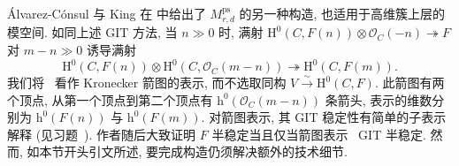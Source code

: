 \begin{remark}[箭图构造]\label{src:9.5.20}
\'Alvarez-C\'onsul 与 King 在 \cite{CK07} 中给出了 $M_{r,d}^{\mathrm{ps}}$ 的另一种构造, 也适用于高维簇上层的模空间. 如同上述 GIT 方法, 当 $n\gg0$ 时, 满射 $\mathrm H^0(C,F(n))\otimes\mathcal O_C(-n)\twoheadrightarrow F$ 对 $m-n\gg0$ 诱导满射
\begin{equation}\label{src:9.5.21}
\mathrm H^0(C,F(n))\otimes\mathrm H^0(C,\mathcal O_C(m-n))\twoheadrightarrow\mathrm H^0(C,F(m)).
\end{equation}
我们将~ 看作 Kronecker 箭图的表示, 而不选取同构 $V\xrightarrow{\sim}\mathrm H^0(C,F)$. 此箭图有两个顶点, 从第一个顶点到第二个顶点有 $\mathrm h^0(\mathcal O_C(m-n))$ 条箭头, 表示的维数分别为 $\mathrm h^0(F(n))$ 与 $\mathrm h^0(F(m))$. 对箭图表示, 其 GIT 稳定性有简单的子表示解释 (见习题~). 作者随后大致证明 $F$ 半稳定当且仅当箭图表示~ GIT 半稳定. 然而, 如本节开头引文所述, 要完成构造仍须解决额外的技术细节.
\end{remark}

